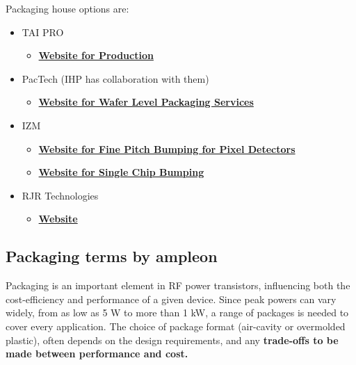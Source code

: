 \documentclass{article}
\begin{document}
Packaging house options are:

\begin{itemize}
	\item TAI PRO
	\begin{itemize}
		\item \href{https://www.taipro.be/production}{\textbf{Website for Production}}
	\end{itemize}
	\item PacTech (IHP has collaboration with them)
	\begin{itemize}
		\item \href{https://pactech.com/wafer-level-packaging-services/}{\textbf{Website for Wafer Level Packaging Services}}
	\end{itemize}
	\item IZM
	\begin{itemize}
		\item \href{https://www.izm.fraunhofer.de/en/abteilungen/wafer-level-system-integration/leistungsangebot/fine-pitch-bumping-for-pixel-detectors.html}{\textbf{Website for Fine Pitch Bumping for Pixel Detectors}}
		\item \href{https://www.izm.fraunhofer.de/en/abteilungen/wafer-level-system-integration/leistungsangebot/single_chip_bumping.html}{\textbf{Website for Single Chip Bumping}}
	\end{itemize}
	\item RJR Technologies
	\begin{itemize}
		\item \href{https://www.rjrtechnologies.com/}{\textbf{Website}}
	\end{itemize}
\end{itemize}




\subsection{Packaging terms by ampleon}

Packaging is an important element in RF power transistors, influencing both the cost-efficiency and performance of a given device. Since peak powers can vary widely, from as low as 5 W to more than 1 kW, a range of packages is needed to cover every application. The choice of package format (air-cavity or overmolded plastic), often depends on the design requirements, and any \textbf{trade-offs to be made between performance and cost.} \\
\end{document}
